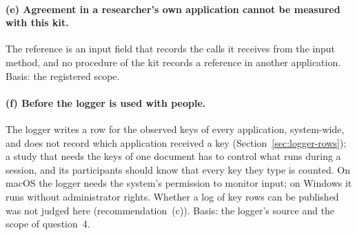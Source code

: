 \paragraph{(e) Agreement in a researcher's own application cannot be measured with this kit.} The reference is an
input field that records the calls it receives from the input method, and no procedure of the kit records a reference
in another application. Basis: the registered scope.

\paragraph{(f) Before the logger is used with people.} The logger writes a row for the observed keys of every
application, system-wide, and does not record which application received a key (Section~\ref{sec:logger-rows}); a
study that needs the keys of one document has to control what runs during a session, and its participants should know
that every key they type is counted. On macOS the logger needs the system's permission to monitor input; on Windows it
runs without administrator rights. Whether a log of key rows can be published was not judged here (recommendation~(c)).
Basis: the logger's source and the scope of question~4.
